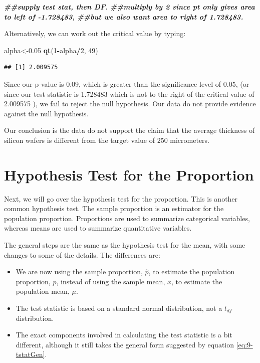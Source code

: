 \documentclass[
]{book}
\newenvironment{Shaded}{\begin{snugshade}}{\end{snugshade}}
\newcommand{\DecValTok}[1]{\textcolor[rgb]{0.00,0.00,0.81}{#1}}
\newcommand{\DocumentationTok}[1]{\textcolor[rgb]{0.56,0.35,0.01}{\textbf{\textit{#1}}}}
\newcommand{\FloatTok}[1]{\textcolor[rgb]{0.00,0.00,0.81}{#1}}
\newcommand{\FunctionTok}[1]{\textcolor[rgb]{0.13,0.29,0.53}{\textbf{#1}}}
\newcommand{\NormalTok}[1]{#1}
\newcommand{\OtherTok}[1]{\textcolor[rgb]{0.56,0.35,0.01}{#1}}
\newcommand{\SpecialCharTok}[1]{\textcolor[rgb]{0.81,0.36,0.00}{\textbf{#1}}}
\begin{document}
\begin{Shaded}
\begin{Highlighting}[]
\DocumentationTok{\#\#supply test stat, then DF.}
\DocumentationTok{\#\#multiply by 2 since pt only gives area to left of {-}1.728483, }
\DocumentationTok{\#\#but we also want area to right of 1.728483. }
\end{Highlighting}
\end{Shaded}

Alternatively, we can work out the critical value by typing:

\begin{Shaded}
\begin{Highlighting}[]
\NormalTok{alpha}\OtherTok{\textless{}{-}}\FloatTok{0.05}
\FunctionTok{qt}\NormalTok{(}\DecValTok{1}\SpecialCharTok{{-}}\NormalTok{alpha}\SpecialCharTok{/}\DecValTok{2}\NormalTok{, }\DecValTok{49}\NormalTok{)}
\end{Highlighting}
\end{Shaded}

\begin{verbatim}
## [1] 2.009575
\end{verbatim}

Since our p-value is 0.09, which is greater than the significance level of 0.05, (or since our test statistic is 1.728483 which is not to the right of the critical value of 2.009575 ), we fail to reject the null hypothesis. Our data do not provide evidence against the null hypothesis.

Our conclusion is the data do not support the claim that the average thickness of silicon wafers is different from the target value of 250 micrometers.

\section{Hypothesis Test for the Proportion}\label{hypothesis-test-for-the-proportion}

Next, we will go over the hypothesis test for the proportion. This is another common hypothesis test. The sample proportion is an estimator for the population proportion. Proportions are used to summarize categorical variables, whereas means are used to summarize quantitative variables.

The general steps are the same as the hypothesis test for the mean, with some changes to some of the details. The differences are:

\begin{itemize}
\item
  We are now using the sample proportion, \(\hat{p}\), to estimate the population proportion, \(p\), instead of using the sample mean, \(\bar{x}\), to estimate the population mean, \(\mu\).
\item
  The test statistic is based on a standard normal distribution, not a \(t_{df}\) distribution.
\item
  The exact components involved in calculating the test statistic is a bit different, although it still takes the general form suggested by equation \eqref{eq:9-tstatGen}.
\end{itemize}
\end{document}
